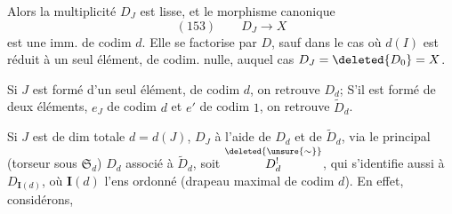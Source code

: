 
Alors la multiplicité $D_J$ est lisse,  et le morphisme canonique
\[
(153)\qquad D_J\longrightarrow X
\]
est une imm.  de codim $d$.
Elle se factorise par $D$, sauf dans le cas où $d(I)$ est réduit à un seul élément, de codim. nulle, auquel cas $D_J=\deleted{D_0}=X$.

Si $J$ est formé d'un seul élément, de codim $d$, on retrouve $D_d$; S'il est formé de deux éléments,  $e_J$ de codim $d$ et $e'$ de codim $1$, on retrouve $\widetilde D_d$.

Si $J$ est de dim totale $d=d(J)$,    $D_J$ à l'aide de $D_d$ et de $\widetilde D_d$, via le  principal (torseur sous $\mathfrak S_d$)  $D_d$ associé à $\widetilde D_d$, soit $\overset{\deleted{\unsure{\sim}}}{D^!_d}$, qui s'identifie aussi à $D_{\mathbf I(d)}$, où $\mathbf I(d)$ l'ens ordonné
(drapeau maximal de codim $d$). En effet, considérons,
